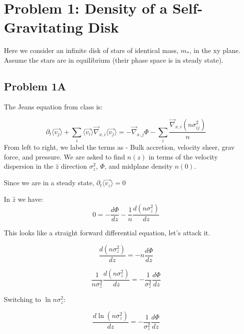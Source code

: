 \section*{Problem 1: Density of a Self-Gravitating Disk}

Here we consider an infinite disk of stars of identical mass, $m_{*}$, in the xy plane. Assume the stars are in equilibrium
(their phase space is in steady state).

\subsection*{Problem 1A}



The Jeans equation from class is:

\begin{equation}
    \partial_t \langle{\vec{v_j}} \rangle + \sum_i \langle{\vec{v_i}} \rangle 
    \vec{\nabla}_{x, i} \langle{\vec{v_j}} \rangle = - \vec{\nabla}_{x, j} \Phi - \sum_i \frac{\vec{\nabla}_{x, i} (n\sigma_{ij}^2)}{n}
\end{equation}
From left to right, we label the terms as - Bulk accretion, velocity sheer, grav force, and pressure. We are asked to find  $n(z)$ in terms of the velocity dispersion in the $\hat{z}$ direction $\sigma_z^2$, $\Phi$, and midplane density $n(0)$.
    
Since we are in a steady state, $\partial_t \langle{\vec{v_z}} \rangle = 0$

In $\hat{z}$ we have: 
\begin{equation}
    0 = -\frac{d\Phi}{dz} - \frac{1}{n}\frac{d(n\sigma^2_z)}{dz}
\end{equation}

This looks like a straight forward differential equation, let's attack it. 

\begin{equation}
    \frac{d(n\sigma^2_z)}{dz} = - n\frac{d\Phi}{dz}
\end{equation}


\begin{equation}
    \frac{1}{n\sigma^2_z}\frac{d(n\sigma^2_z)}{dz} = -  \frac{1}{\sigma^2_z}\frac{d\Phi}{dz}
\end{equation}

Switching to $\ln{n \sigma_z^2}$:

\begin{equation}
    \frac{d\ln{(n\sigma^2_z)}}{dz} = -  \frac{1}{\sigma^2_z}\frac{d\Phi}{dz}
\end{equation}

